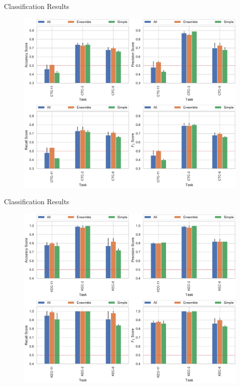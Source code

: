\begin{frame}{Classification Results}
    \begin{figure}
        \includegraphics[scale=0.4]{img/results/CTC_summary.pdf}
    \end{figure}
\end{frame}

\begin{frame}{Classification Results}
    \begin{figure}
        \includegraphics[scale=0.4]{img/results/KEC_summary.pdf}
    \end{figure}
\end{frame}

